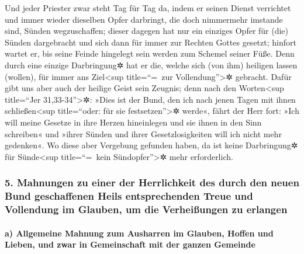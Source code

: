  Und jeder Priester zwar steht Tag für Tag da, indem er
seinen Dienst verrichtet und immer wieder dieselben Opfer darbringt, die
doch nimmermehr imstande sind, Sünden wegzuschaffen; 
dieser dagegen hat nur ein einziges Opfer für (die) Sünden dargebracht
und sich dann für immer zur Rechten Gottes gesetzt; 
hinfort wartet er, bis seine Feinde hingelegt sein werden zum Schemel
seiner Füße.  Denn durch eine einzige Darbringung✲ hat er
die, welche sich (von ihm) heiligen lassen (wollen), für immer ans
Ziel\textless sup title=``=~zur Vollendung''\textgreater✲ gebracht.
 Dafür gibt uns aber auch der heilige Geist sein Zeugnis;
denn nach den Worten\textless sup title=``Jer 31,33-34''\textgreater✲:
 »Dies ist der Bund, den ich nach jenen Tagen mit ihnen
schließen\textless sup title=``oder: für sie festsetzen''\textgreater✲
werde«, fährt der Herr fort: »Ich will meine Gesetze in ihre Herzen
hineinlegen und sie ihnen in den Sinn schreiben«  und
»ihrer Sünden und ihrer Gesetzlosigkeiten will ich nicht mehr gedenken«.
 Wo diese aber Vergebung gefunden haben, da ist keine
Darbringung✲ für Sünde\textless sup title=``=~kein
Sündopfer''\textgreater✲ mehr erforderlich.

\hypertarget{mahnungen-zu-einer-der-herrlichkeit-des-durch-den-neuen-bund-geschaffenen-heils-entsprechenden-treue-und-vollendung-im-glauben-um-die-verheiuxdfungen-zu-erlangen}{%
\subsubsection{5. Mahnungen zu einer der Herrlichkeit des durch den
neuen Bund geschaffenen Heils entsprechenden Treue und Vollendung im
Glauben, um die Verheißungen zu
erlangen}\label{mahnungen-zu-einer-der-herrlichkeit-des-durch-den-neuen-bund-geschaffenen-heils-entsprechenden-treue-und-vollendung-im-glauben-um-die-verheiuxdfungen-zu-erlangen}}

\hypertarget{a-allgemeine-mahnung-zum-ausharren-im-glauben-hoffen-und-lieben-und-zwar-in-gemeinschaft-mit-der-ganzen-gemeinde}{%
\paragraph{a) Allgemeine Mahnung zum Ausharren im Glauben, Hoffen und
Lieben, und zwar in Gemeinschaft mit der ganzen
Gemeinde}\label{a-allgemeine-mahnung-zum-ausharren-im-glauben-hoffen-und-lieben-und-zwar-in-gemeinschaft-mit-der-ganzen-gemeinde}}


